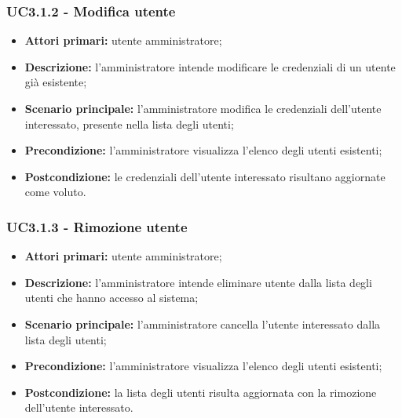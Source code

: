 \subsubsection{UC3.1.2 - Modifica utente}
\begin{itemize}
	\item \textbf{Attori primari:} utente amministratore;
	\item \textbf{Descrizione:} l'amministratore intende modificare le credenziali di un utente già esistente;
	\item \textbf{Scenario principale:} l'amministratore modifica le credenziali dell'utente interessato, presente nella lista degli utenti;
	\item \textbf{Precondizione:} l'amministratore visualizza l'elenco degli utenti esistenti;
	\item \textbf{Postcondizione:} le credenziali dell'utente interessato risultano aggiornate come voluto.
\end{itemize}

\subsubsection{UC3.1.3 - Rimozione utente}
\begin{itemize}
	\item \textbf{Attori primari:} utente amministratore;
	\item \textbf{Descrizione:} l'amministratore intende eliminare utente dalla lista degli utenti che hanno accesso al sistema;
	\item \textbf{Scenario principale:} l'amministratore cancella l'utente interessato dalla lista degli utenti;
	\item \textbf{Precondizione:} l'amministratore visualizza l'elenco degli utenti esistenti;
	\item \textbf{Postcondizione:} la lista degli utenti risulta aggiornata con la rimozione dell'utente interessato.
\end{itemize}

